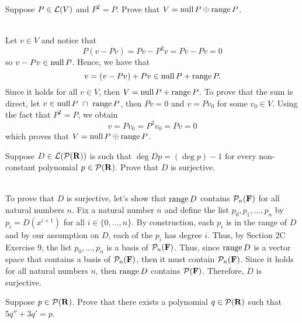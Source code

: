 \begin{exercise}
    Suppose $P \in \mathcal{L}(V)$ and $P^2 = P$. Prove that $V = \operatorname{\text{null}} P \oplus \operatorname{\text{range}} P$. \\
\end{exercise}

\begin{solution}
    \\ Let $v \in V$ and notice that
    $$P(v - Pv) = Pv - P^2v = Pv - Pv = 0$$
    so $v - Pv \in \operatorname{\text{null}} P$. Hence, we have that
    $$v = (v - Pv) + Pv \in \operatorname{\text{null}} P + \operatorname{\text{range}} P.$$
    Since it holds for all $v \in V$, then $V = \operatorname{\text{null}} P + \operatorname{\text{range}} P$. To prove that the sum is direct, let $v \in \Null P \ \cap \  \range P$, then $Pv = 0$ and $v = Pv_0$ for some $v_0 \in V$. Using the fact that $P^2 = P$, we obtain
    $$v = Pv_0 = P^2v_0 = Pv = 0$$
    which proves that $V = \operatorname{\text{null}} P \oplus \operatorname{\text{range}} P$.\\
\end{solution}

\begin{exercise}
    Suppose $D \in \mathcal{L}(\mathcal{P}(\mathbf{R}))$ is such that $\deg Dp = (\deg p) - 1$ for every non-constant polynomial $p \in \mathcal{P}(\mathbf{R})$. Prove that $D$ is surjective. \\
\end{exercise}

\begin{solution}
    \\ To prove that $D$ is surjective, let's show that $\operatorname{\text{range}} D$ contains $\mathcal{P}_n(\mathbf{F})$ for all natural numbers $n$. Fix a natural number $n$ and define the list $p_0, p_1, ..., p_n$ by $p_i = D(x^{i+1})$ for all $i \in \{0, ..., n\}$. By construction, each $p_i$ is in the range of $D$ and by our assumption on $D$, each of the $p_i$ has degree $i$. Thus, by Section 2C Exercise 9, the list $p_0, ..., p_n$ is a basis of $\mathcal{P}_n(\mathbf{F})$. Thus, since $\operatorname{\text{range}} D$ is a vector space that contains a basis of $\mathcal{P}_n(\mathbf{F})$, then it must contain $\mathcal{P}_n(\mathbf{F})$. Since it holds for all natural numbers $n$, then $\operatorname{\text{range}} D$ contains $\mathcal{P}(\mathbf{F})$. Therefore, $D$ is surjective. \\
\end{solution}

\begin{exercise}
    Suppose $p \in \mathcal{P}(\mathbf{R})$. Prove that there exists a polynomial $q \in \mathcal{P}(\mathbf{R})$ such that $5q'' + 3q' = p$. \\
\end{exercise}

